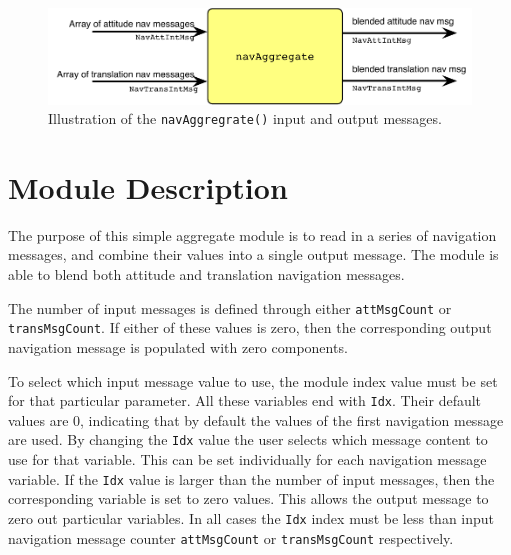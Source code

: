 
\begin{figure}[htb]
	\centerline{
	\includegraphics[]{Figures/moduleImg}
	}
	\caption{Illustration of the {\tt navAggregrate()} input and output messages.}
	\label{fig:moduleImg}
\end{figure}

\section{Module Description}
The purpose of this simple aggregate module is to read in a series of navigation messages, and combine their values into a single output message.  The module is able to blend both attitude and translation navigation messages.   

The number of input messages is defined through either {\tt attMsgCount} or {\tt transMsgCount}.  If either of these values is zero, then the corresponding output navigation message is populated with zero components.  

To select which input message value to use, the module index value must be set for that particular parameter.  All these variables end with {\tt Idx}.  Their default values are 0, indicating that by default the values of the first navigation message are used.   By changing the {\tt Idx} value the user selects which message content to use for that variable.  This can be set individually for each navigation message variable.   If the {\tt Idx} value is larger than the number of input messages, then the corresponding variable is set to zero values.  This allows the output message to zero out particular variables.  In all cases the {\tt Idx} index must be less than input navigation message counter  {\tt attMsgCount} or {\tt transMsgCount} respectively.  
